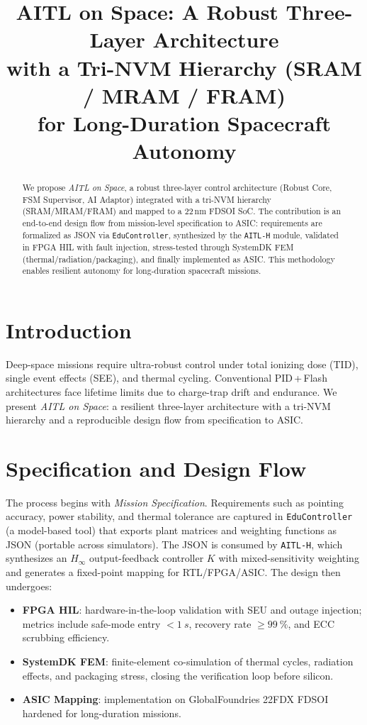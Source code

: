 \documentclass[conference]{IEEEtran}
\title{AITL on Space: A Robust Three-Layer Architecture\\
with a Tri-NVM Hierarchy (SRAM / MRAM / FRAM)\\
for Long-Duration Spacecraft Autonomy}
\author{
\IEEEauthorblockN{Shinichi Samizo}
\IEEEauthorblockA{Independent Semiconductor Researcher\\
Former Engineer at Seiko Epson Corporation\\
Email: shin3t72@gmail.com\quad GitHub: \url{https://github.com/Samizo-AITL}}
}
\begin{document}
\maketitle

\begin{abstract}
We propose \emph{AITL on Space}, a robust three-layer control architecture (Robust Core, FSM Supervisor, AI Adaptor) integrated with a tri-NVM hierarchy (SRAM/MRAM/FRAM) and mapped to a 22\,nm FD\!SOI SoC. The contribution is an end-to-end design flow from mission-level specification to ASIC: requirements are formalized as JSON via \texttt{EduController}, synthesized by the \texttt{AITL-H} module, validated in FPGA HIL with fault injection, stress-tested through SystemDK FEM (thermal/radiation/packaging), and finally implemented as ASIC. This methodology enables resilient autonomy for long-duration spacecraft missions.
\end{abstract}

\section{Introduction}
Deep-space missions require ultra-robust control under total ionizing dose (TID), single event effects (SEE), and thermal cycling. Conventional PID\,+\,Flash architectures face lifetime limits due to charge-trap drift and endurance. We present \emph{AITL on Space}: a resilient three-layer architecture with a tri-NVM hierarchy and a reproducible design flow from specification to ASIC.

\section{Specification and Design Flow}
The process begins with \emph{Mission Specification}. Requirements such as pointing accuracy, power stability, and thermal tolerance are captured in \texttt{EduController} (a model-based tool) that exports plant matrices and weighting functions as JSON (portable across simulators). The JSON is consumed by \texttt{AITL-H}, which synthesizes an $H_\infty$ output-feedback controller $K$ with mixed-sensitivity weighting and generates a fixed-point mapping for RTL/FPGA/ASIC. The design then undergoes:
\begin{itemize}
  \item \textbf{FPGA HIL}: hardware-in-the-loop validation with SEU and outage injection; metrics include safe-mode entry \(<\SI{1}{s}\), recovery rate \(\ge\SI{99}{\percent}\), and ECC scrubbing efficiency.
  \item \textbf{SystemDK FEM}: finite-element co-simulation of thermal cycles, radiation effects, and packaging stress, closing the verification loop before silicon.
  \item \textbf{ASIC Mapping}: implementation on GlobalFoundries 22FDX FD\!SOI hardened for long-duration missions.
\end{itemize}
\end{document}
